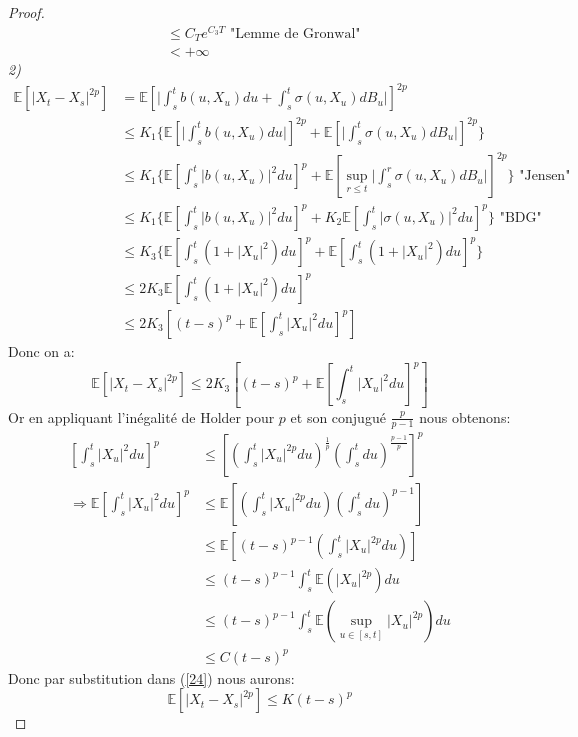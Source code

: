 \documentclass[A4paper,12pt]{report}
\newcommand{\E}{{\mathbb{E}}}
\begin{document}
\begin{proof}
\begin{align*}
 &\leq C_T   e^{C_3T} \text{ "Lemme de Gronwal" } \\
 &< +\infty
\end{align*}
\textit{2)} \begin{align*}
\E \left[ \lvert X_t  - X_s  \rvert ^{2p}\right] &= \E \left[\lvert \int_s ^t b(u,X_u ) du + \int_s ^t \sigma(u, X_u) dB_u \rvert \right]^{2p}\\
&\leq K_1 \{\E \left[\lvert \int_s ^t b(u, X_u )du \rvert\right]^{2p} +\E\left[ \lvert \int_s ^t \sigma(u,X_u )dB_u \rvert\right]^{2p}\}\\
&\leq K_1 \{\E \left[ \int_s ^t \lvert b(u, X_u ) \rvert^2 du  \right]^{p} + \E\left[ \sup_{r \leq t}\lvert \int_s ^r \sigma(u,X_u )dB_u\rvert \right]^{2p}\} \text{ "Jensen" }\\
&\leq K_1 \{\E \left[ \int_s ^t \lvert b(u, X_u )\rvert^2 du \right]^{p} +K_2\E\left[ \int_s ^t \lvert \sigma(u,X_u )\rvert^2du \right]^p\} \text{ "BDG" }\\
&\leq K_3 \{\E \left[ \int_s ^t (1 + \lvert X_u \rvert^{2}) du \right]^{p} +\E\left[ \int_s ^t  (1 + \lvert X_u \rvert^{2}) du \right]^p\} \\
&\leq 2 K_3 \E \left[ \int_s ^t (1 + \lvert X_u \rvert^{2}) du \right]^{p}\\
&\leq 2 K_3 \left[(t-s)^p + \E \left[ \int_s ^t \lvert X_u \rvert^{2} du\right]^p \right]
\end{align*} 
Donc on a:
\begin{equation}\label{24}
\E \left[ \lvert X_t  - X_s  \rvert ^{2p}\right] \leq 2 K_3 \left[(t-s)^p + \E \left[ \int_s ^t \lvert X_u \rvert^{2} du\right]^p \right]
\end{equation}
Or en appliquant l'inégalité de Holder pour $p$ et son conjugué $\frac{p}{p-1}$ nous obtenons: \begin{align*}
\left[ \int_s ^t \lvert X_u \rvert^{2} du\right]^p &\leq \left[ \left(\int_s ^t \lvert X_u \rvert^{2p} du\right)^{\frac{1}{p}} \left(\int_s ^t du \right)^{\frac{p-1}{p}} \right]^p\\
\Rightarrow \E \left[ \int_s ^t \lvert X_u \rvert^{2} du\right]^p &\leq \E \left[ \left(\int_s ^t \lvert X_u \rvert^{2p} du\right) \left(\int_s ^t du \right)^{p-1} \right]\\
&\leq \E \left[(t-s)^{p-1} \left(\int_s ^t \lvert X_u \rvert^{2p} du\right)  \right]\\
&\leq (t-s)^{p-1} \int_s ^t \E(\lvert X_u \rvert^{2p}) du  \\
&\leq (t-s)^{p-1} \int_s ^t \E( \sup_{u \in [s,t]}\lvert X_u \rvert^{2p}) du  \\
& \leq C (t-s)^p
\end{align*}
Donc par substitution dans (\ref{24}) nous aurons:
\begin{equation}\label{25}
\E \left[ \lvert X_t  - X_s  \rvert ^{2p}\right] \leq K (t-s)^p
\end{equation}
\end{proof}
\end{document}
